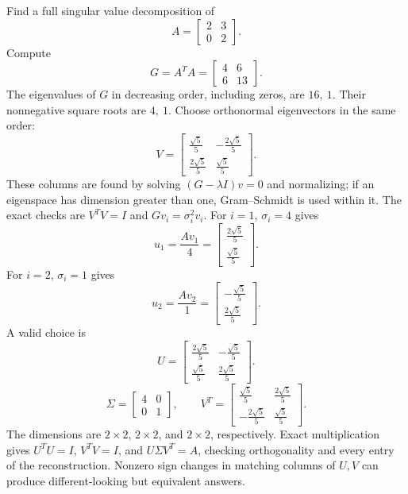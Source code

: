 \goal Find a full singular value decomposition of
\[A=\begin{bmatrix}2&3\\0&2\end{bmatrix}.\]
Compute
\[G=A^TA=\begin{bmatrix}4&6\\6&13\end{bmatrix}.\]
The eigenvalues of $G$ in decreasing order, including zeros, are $16,\ 1$. Their nonnegative square roots are $4,\ 1$. Choose orthonormal eigenvectors in the same order:
\[V=\begin{bmatrix}\frac{\sqrt{5}}{5}&- \frac{2 \sqrt{5}}{5}\\\frac{2 \sqrt{5}}{5}&\frac{\sqrt{5}}{5}\end{bmatrix}.\]
These columns are found by solving $(G-\lambda I)v=0$ and normalizing; if an eigenspace has dimension greater than one, Gram--Schmidt is used within it. The exact checks are $V^TV=I$ and $Gv_i=\sigma_i^2v_i$.
For $i=1$, $\sigma_i=4$ gives
\[u_{1}=\frac{Av_{1}}{4}=\begin{bmatrix}\frac{2 \sqrt{5}}{5}\\\frac{\sqrt{5}}{5}\end{bmatrix}.\]
For $i=2$, $\sigma_i=1$ gives
\[u_{2}=\frac{Av_{2}}{1}=\begin{bmatrix}- \frac{\sqrt{5}}{5}\\\frac{2 \sqrt{5}}{5}\end{bmatrix}.\]
A valid choice is
\[U=\begin{bmatrix}\frac{2 \sqrt{5}}{5}&- \frac{\sqrt{5}}{5}\\\frac{\sqrt{5}}{5}&\frac{2 \sqrt{5}}{5}\end{bmatrix}.\]
\[\Sigma=\begin{bmatrix}4&0\\0&1\end{bmatrix},\qquad V^T=\begin{bmatrix}\frac{\sqrt{5}}{5}&\frac{2 \sqrt{5}}{5}\\- \frac{2 \sqrt{5}}{5}&\frac{\sqrt{5}}{5}\end{bmatrix}.\]
The dimensions are $2\times2$, $2\times2$, and $2\times2$, respectively. Exact multiplication gives $U^TU=I$, $V^TV=I$, and $U\Sigma V^T=A$, checking orthogonality and every entry of the reconstruction. Nonzero sign changes in matching columns of $U,V$ can produce different-looking but equivalent answers.


